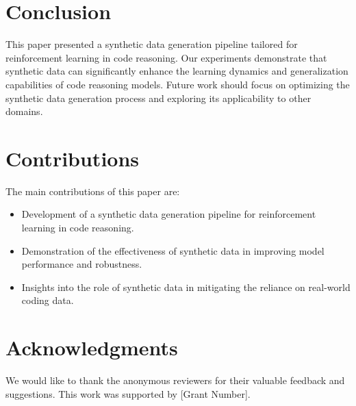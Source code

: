 \documentclass{article}
\begin{document}
\section{Conclusion}
\label{sec:conclusion}

This paper presented a synthetic data generation pipeline tailored for reinforcement learning in code reasoning. Our experiments demonstrate that synthetic data can significantly enhance the learning dynamics and generalization capabilities of code reasoning models. Future work should focus on optimizing the synthetic data generation process and exploring its applicability to other domains.

\section{Contributions}
\label{sec:contributions}

The main contributions of this paper are:
\begin{itemize}
    \item Development of a synthetic data generation pipeline for reinforcement learning in code reasoning.
    \item Demonstration of the effectiveness of synthetic data in improving model performance and robustness.
    \item Insights into the role of synthetic data in mitigating the reliance on real-world coding data.
\end{itemize}

\section*{Acknowledgments}
We would like to thank the anonymous reviewers for their valuable feedback and suggestions. This work was supported by [Grant Number].



\end{document}
